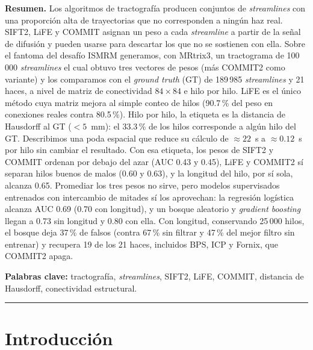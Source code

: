 \documentclass[11pt,a4paper]{article}
\begin{document}
\vspace{0.6em}
\begin{center}
\begin{minipage}{0.9\textwidth}
\small
\textbf{Resumen.}\;
Los algoritmos de tractograf\'ia producen conjuntos de \textit{streamlines} con una
proporci\'on alta de trayectorias que no corresponden a ning\'un haz real. SIFT2, LiFE y
COMMIT asignan un peso a cada \textit{streamline} a partir de la se\~nal de difusi\'on y
pueden usarse para descartar los que no se sostienen con ella. Sobre el fantoma del
desaf\'io ISMRM generamos, con MRtrix3, un tractograma de 100\,000 \textit{streamlines} el cual obtuvo tres vectores de pesos (m\'as COMMIT2 como variante) y los comparamos con
el \textit{ground truth} (GT) de 189\,985 \textit{streamlines} y 21 haces, a nivel de
matriz de conectividad $84\times 84$ e hilo por hilo. LiFE es el \'unico m\'etodo cuya
matriz mejora al simple conteo de hilos (90.7\,\% del peso en conexiones reales contra
80.5\,\%). Hilo por hilo, la etiqueta es la distancia de Hausdorff al GT ($<5$~mm): el
33.3\,\% de los hilos corresponde a alg\'un hilo del GT. Describimos una poda espacial que
reduce su c\'alculo de $\approx 22$~s a $\approx 0.12$~s por hilo sin cambiar el resultado. Con
esa etiqueta, los pesos de SIFT2 y COMMIT ordenan por debajo del azar (AUC 0.43 y 0.45),
LiFE y COMMIT2 s\'i separan hilos buenos de malos (0.60 y 0.63), y la longitud del hilo,
por s\'i sola, alcanza 0.65. Promediar los tres pesos no sirve, pero modelos supervisados
entrenados con intercambio de mitades s\'i los aprovechan: la regresi\'on log\'istica
alcanza AUC 0.69 (0.70 con longitud), y un bosque aleatorio y \textit{gradient boosting}
llegan a 0.73 sin longitud y 0.80 con ella. Con longitud, conservando 25\,000 hilos, el
bosque deja 37\,\% de falsos (contra 67\,\% sin filtrar y 47\,\% del mejor filtro sin
entrenar) y recupera 19 de los 21 haces, incluidos BPS, ICP y Fornix, que COMMIT2 apaga.

\medskip
\textbf{Palabras clave:} tractograf\'ia, \textit{streamlines}, SIFT2, LiFE, COMMIT,
distancia de Hausdorff, conectividad estructural.
\end{minipage}
\end{center}

\vspace{0.4em}
{\color{cimatblue}\rule{\textwidth}{0.6pt}}

\section{Introducci\'on}
\end{document}
